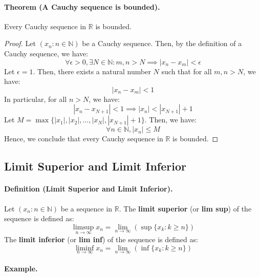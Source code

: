 \documentclass[openany]{book}
\numberwithin{equation}{section}
\begin{document}
\paragraph{Theorem (A Cauchy sequence is bounded).}

    Every Cauchy sequence in $\mathbb{R}$ is bounded.
\par
\begin{proof}
    Let $(x_n : n \in \mathbb{N})$ be a Cauchy sequence. Then, by the definition of a Cauchy sequence, we have:
    $$\forall \epsilon > 0, \exists N \in \mathbb{N}: m,n > N \implies |x_n - x_m| < \epsilon$$
    Let $\epsilon = 1$. Then, there exists a natural number $N$ such that for all $m,n > N$, we have:
    $$|x_n - x_m| < 1$$
    In particular, for all $n > N$, we have:
    $$|x_n - x_{N+1}| < 1 \implies |x_n| < |x_{N+1}| + 1$$
    Let $M = \max\{|x_1|, |x_2|, \ldots, |x_N|, |x_{N+1}| + 1\}$. Then, we have:
    $$\forall n \in \mathbb{N}, |x_n| \leq M$$
    Hence, we conclude that every Cauchy sequence in $\mathbb{R}$ is bounded.
\end{proof}
\subsection{Limit Superior and Limit Inferior}
\paragraph{Definition (Limit Superior and Limit Inferior).}

    Let $(x_n : n \in \mathbb{N})$ be a sequence in $\mathbb{R}$. The \textbf{limit superior} (or \textbf{lim sup}) of the sequence is defined as:
    $$\limsup_{n \to \infty} x_n = \lim_{n \to \infty} (\sup\{x_k : k \geq n\})$$
    The \textbf{limit inferior} (or \textbf{lim inf}) of the sequence is defined as:
    $$\liminf_{n \to \infty} x_n = \lim_{n \to \infty} (\inf\{x_k : k \geq n\})$$
\par
\paragraph{Example.}
\end{document}
